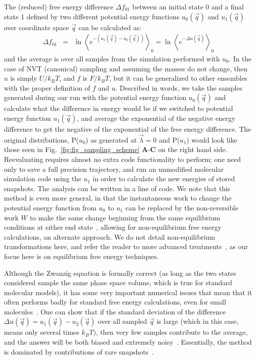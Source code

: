 \documentclass[9pt,bestpractices]{livecoms}
\newcommand{\expect}[1]{\left\langle{#1}\right\rangle}
\begin{document}
The (reduced) free energy difference $\Delta f_{01}$ between an initial state 0 and a final state 1 defined by two different potential energy functions 
$u_0(\vec{q})$ and $u_1(\vec{q})$ over coordinate space $\vec{q}$ can be calculated as:
\begin{eqnarray}
\Delta f_{01} & = & \ln \expect{e^{-(u_1(\vec{q}) - u_0(\vec{q}))}}_0 =  \ln \expect{e^{-\Delta u(\vec{q})} }_0
\end{eqnarray}\label{eqn.zwanzig}
and the average is over all samples from the simulation performed with $u_0$. In the case of NVT (canonical) sampling and assuming the masses do not change, then $u$ is simply $U/k_BT$, and $f$ is $F/k_BT$, but it can be generalized to other ensembles with the proper definition of $f$ and $u$.
Described in words, we take the samples generated during our run with the potential energy function $u_0(\vec{q})$ and calculate what the difference in energy would be if we switched to potential energy function $u_1(\vec{q})$, and average the exponential of the negative energy difference to get the negative of the exponential of the free energy difference. The original distributions, P($u_0$) as generated at $\vec{\lambda}=0$ and P($u_1$) would look like those seen in Fig.~\ref{fig:fig_sampling_scheme} \textbf{A}-\textbf{C} on the right hand side. Reevaluating requires almost no extra code functionality to perform; one need only to save a full precision trajectory, and run an unmodified molecular simulation code using the $u_1$ in order to calculate the new energies of stored snapshots. The analysis can be written in a line of code. We note that this method is even more general, in that the instantaneous work to change the potential energy function from $u_0$ to $u_1$ can be replaced by the non-reversible work $W$ to make the same change beginning from the same equilibrium conditions at either end state~\cite{jarzynski1997nonequilibrium,jarzynski1998equilibrium,crooks2000pathensemble}, allowing for non-equilibrium free energy calculations, an alternate approach. We do not detail non-equilibrium transformations here, and refer the reader to more advanced treatments~\cite{maragakis2008bayesian,oberhofer2005biased,procacci2015unbiased,shirts2003equilibriuma,ytreberg2004singleensemble, gapsys2020large}, as our focus here is on equilibrium free energy techniques.

Although the Zwanzig equation is formally correct (as long as the two states considered sample the same phase space volume, which is true for standard molecular models), it has some very important numerical issues that mean that it often performs badly for standard free energy calculations, even for small molecules~\cite{shirts2005comparison,lu2003appropriate}. One can show that if the standard deviation of the difference $\Delta u(\vec{q}) = u_1(\vec{q})-u_2(\vec{q})$ over all sampled $\vec{q}$ is large (which in this case, means only several times $k_BT)$, then very few samples contribute to the average, and the answer will be both biased and extremely noisy~\cite{lelievre2010free}. Essentially, the method is dominated by contributions of rare snapshots~\cite{jarzynski2006rare, wu2005phasespaceb, wu2005phasespacec}. 
\end{document}
